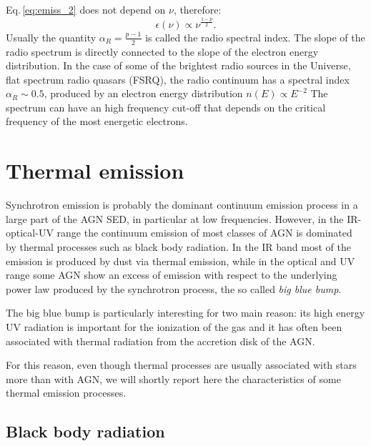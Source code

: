 \documentclass[../main.tex]{subfiles}
\begin{document}
Eq.\,\ref{eq:emiss_2} does not depend on $\nu$, therefore:
\begin{equation}
    \label{eq:emiss_3}
    \epsilon(\nu) \propto \nu^{\frac{1-p}{2}}.
\end{equation}
Usually the quantity $\alpha_R = \frac{p-1}{2}$ is called the radio spectral index.
The slope of the radio spectrum is directly connected to the slope of the electron energy distribution.
In the case of some of the brightest radio sources in the Universe, flat spectrum radio quasars (FSRQ), the radio continuum has a spectral index $\alpha_R \sim 0.5$, produced by an electron energy distribution $n(E)\propto E^{-2}$
The spectrum can have an high frequency cut-off that depends on the critical frequency of the most energetic electrons.

\section{Thermal emission}
\label{sec:thermal_emission}

Synchrotron emission is probably the dominant continuum emission process in a large part of the AGN SED, in particular at low frequencies.
However, in the IR-optical-UV range the continuum emission of most classes of AGN is dominated by thermal processes such as black body radiation.
In the IR band most of the emission is produced by dust via thermal emission, while in the optical and UV range some AGN show an excess of emission with respect to the underlying power law produced by the synchrotron process, the so called \emph{big blue bump}.

The big blue bump is particularly interesting for two main reason: its high energy UV radiation is important for the ionization of the gas and it has often been associated with thermal radiation from the accretion disk of the AGN.

For this reason, even though thermal processes are usually associated with stars more than with AGN, we will shortly report here the characteristics of some thermal emission processes.

\subsection{Black body radiation}
\end{document}
